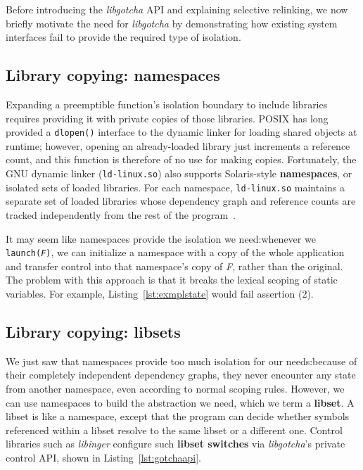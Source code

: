 Before introducing the \textit{libgotcha} API and explaining selective relinking, we
now briefly motivate the need for \textit{libgotcha} by demonstrating how existing
system interfaces fail to provide the required type of isolation.


\subsection{Library copying: namespaces}
\label{sec:namespaces}

Expanding a preemptible function's isolation boundary to include libraries requires
providing it with private copies of those libraries.  POSIX has long provided a
\texttt{dlopen()} interface to the dynamic linker for loading shared objects at
runtime; however, opening an already-loaded library just increments
a reference count, and this function is therefore of no use for making copies.
Fortunately, the GNU dynamic linker (\texttt{ld-linux.so}) also supports
Solaris-style \textbf{namespaces}, or isolated sets of loaded libraries.  For each
namespace, \texttt{ld-linux.so} maintains a separate set of loaded libraries whose
dependency graph and reference counts are tracked independently from the rest of the
program~\cite{dlmopen-manpage}.

It may seem like namespaces provide the isolation we need:\@ whenever we
\texttt{launch(\textnormal{\textit{F}})}, we can initialize a namespace with a copy
of the whole application and transfer control into that namespace's copy of
\textit{F}, rather than the original.  The problem with this approach is that it
breaks the lexical scoping of static variables.  For example,
Listing~\ref{lst:exmplstate} would fail assertion (2).



\subsection{Library copying: libsets}
\label{sec:libsets}

We just saw that namespaces provide too much isolation
for our needs:\@ because of their completely independent dependency graphs, they
never encounter any state from another namespace, even according to normal scoping
rules.  However, we can use namespaces to build the abstraction we need, which we
term a \textbf{libset}.  A libset is like a namespace, except that the program can
decide whether symbols referenced within a libset resolve to the same
libset or a different one.  Control libraries such as \textit{libinger} configure such
\textbf{libset switches} via \textit{libgotcha}'s private control API, shown
in Listing~\ref{lst:gotchaapi}.

